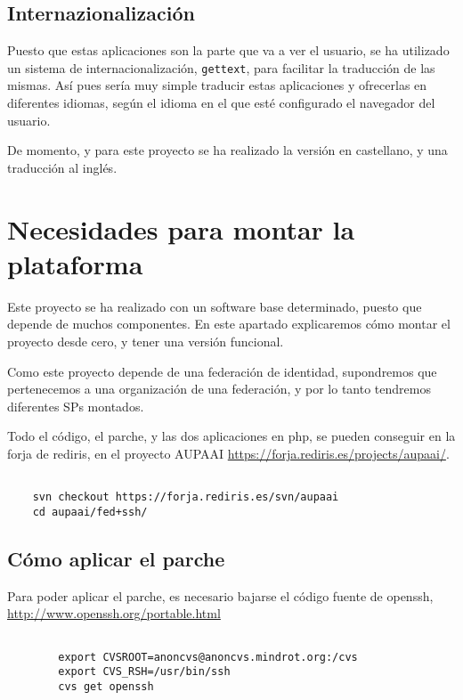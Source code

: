     \subsection{Internazionalización}

    Puesto que estas aplicaciones son la parte que va a ver el
    usuario, se ha utilizado un sistema de internacionalización,
    \texttt{gettext}, para facilitar la traducción de las mismas. Así
    pues sería muy simple traducir estas aplicaciones y ofrecerlas en
    diferentes idiomas, según el idioma en el que esté configurado el
    navegador del usuario.

    De momento, y para este proyecto se ha realizado la versión en
    castellano, y una traducción al inglés.

    \section{Necesidades para montar la plataforma}

    Este proyecto se ha realizado con un software base determinado,
    puesto que depende de muchos componentes. En este apartado
    explicaremos cómo montar el proyecto desde cero, y tener una
    versión funcional.

    Como este proyecto depende de una federación de identidad,
    supondremos que pertenecemos a una organización de una federación,
    y por lo tanto tendremos diferentes SPs montados.

    Todo el código, el parche, y las dos aplicaciones en php, se
    pueden conseguir en la forja de rediris, en el proyecto AUPAAI 
    \url{https://forja.rediris.es/projects/aupaai/}.

    \begin{verbatim}

    svn checkout https://forja.rediris.es/svn/aupaai   
    cd aupaai/fed+ssh/

    \end{verbatim}

        \subsection{Cómo aplicar el parche}

        Para poder aplicar el parche, es necesario bajarse el código
        fuente de openssh, \url{http://www.openssh.org/portable.html}

        \begin{verbatim}

        export CVSROOT=anoncvs@anoncvs.mindrot.org:/cvs
        export CVS_RSH=/usr/bin/ssh
        cvs get openssh

        \end{verbatim}

